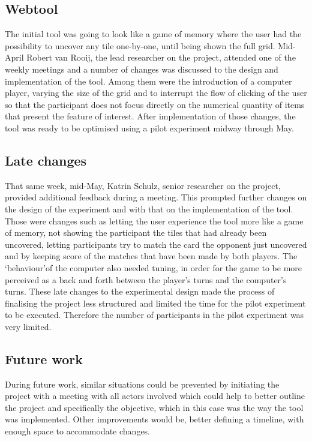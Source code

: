 \documentclass[twoside]{uva-inf-bachelor-thesis}
\theoremstyle{definition}
\begin{document}
\subsection{Webtool}
The initial tool was going to look like a game of memory where the user had the possibility to uncover any tile one-by-one, until being shown the full grid. Mid-April Robert van Rooij, the lead researcher on the project, attended one of the weekly meetings and a number of changes was discussed to the design and implementation of the tool. Among them were the introduction of a computer player, varying the size of the grid and to interrupt the flow of clicking of the user so that the participant does not focus directly on the numerical quantity of items that present the feature of interest. After implementation of those changes, the tool was ready to be optimised using a pilot experiment midway through May.
\subsection{Late changes}
That same week, mid-May, Katrin Schulz, senior researcher on the project, provided additional feedback during a meeting. This prompted further changes on the design of the experiment and with that on the implementation of the tool. Those were changes such as letting the user experience the tool more like a game of memory, not showing the participant the tiles that had already been uncovered, letting participants try to match the card the opponent just uncovered and by keeping score of the matches that have been made by both players. The `behaviour'of the computer also needed tuning, in order for the game to be more perceived as a back and forth between the player's turns and the computer's turns. These late changes to the experimental design made the process of finalising the project less structured and limited the time for the pilot experiment to be executed. Therefore the number of participants in the pilot experiment was very limited. 
\subsection{Future work}
During future work, similar situations could be prevented by initiating the project with a meeting with all actors involved which could help to better outline the project and specifically the objective, which in this case was the way the tool was implemented. Other improvements would be, better defining a timeline, with enough space to accommodate changes.
\end{document}
